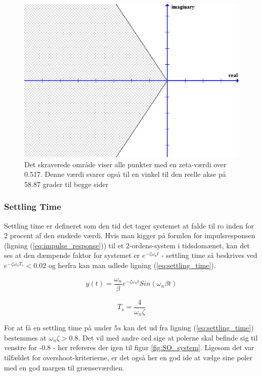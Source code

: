 \begin{figure}[ht]
	\begin{center}
		\includegraphics[scale=0.5]{Billeder/Overshoot.PNG}
	\end{center}
\caption{Det skraverede område viser alle punkter med en zeta-værdi over 0.517. Denne værdi svarer også til en vinkel til den reelle akse på 58.87 grader til begge sider}
\label{fig:Overshoot}
\end{figure}

\subsubsection{Settling Time}

Settling time er defineret som den tid det tager systemet at falde til ro inden for 2 procent af den ønskede værdi. Hvis man kigger på formlen for impulsresponsen (ligning (\ref{eq:impulse_response}))  til et 2-ordens-system i tidsdomænet, kan det ses at den dæmpende faktor for systemet er $e^{-\zeta\omega_{n}t}$ - settling time så beskrives ved $e^{-\zeta\omega_{n}T_{s}}<0.02$ og herfra kan man udlede ligning (\ref{eq:settling_time}).

\begin{equation}\label{eq:impulse_response}
y(t)=\frac{\omega_{n}}{\beta}e^{-\zeta\omega_{n}t}Sin(\omega_{n}\beta t)
\end{equation}

\begin{equation}\label{eq:settling_time}
T_{s}=\frac{4}{\omega_{n}\zeta}
\end{equation}

For at få en settling time på under $5s$ kan det ud fra ligning (\ref{eq:settling_time}) bestemmes at $\omega_{n}\zeta > 0.8$. Det vil med andre ord sige at polerne skal befinde sig til venstre for -0.8 - her refereres der igen til figur \ref{fig:SO_system}. Ligesom det var tilfældet for overshoot-kriterierne, er det også her en god ide at vælge sine poler med en god margen til grænseværdien.

